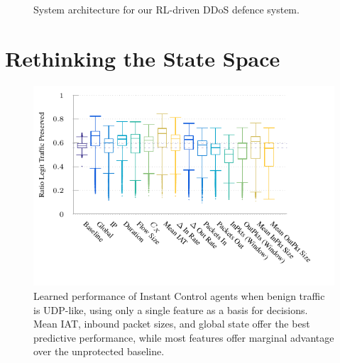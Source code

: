 \documentclass[10pt, times, conference, letterpaper]{IEEEtran}
\begin{document}
\begin{figure}
{}
	\caption{
		System architecture  for our RL-driven DDoS defence system.
		\label{fig:sys-arch}
	}
\end{figure}

\section{Rethinking the State Space}\label{sec:rethinking-the-state-space}

\begin{figure}
	\centering
	\includegraphics[width=0.9\linewidth]{../plots/ftprep-cap-box}
	\vspace{-1cm}
	\caption{
		Learned performance of Instant Control agents when benign traffic is UDP-like, using only a single feature as a basis for decisions.
		Mean IAT, inbound packet sizes, and global state offer the best predictive performance, while most features offer marginal advantage over the unprotected baseline.
		\label{fig:udp-feature-plots}
	}
\end{figure}

\end{document}
